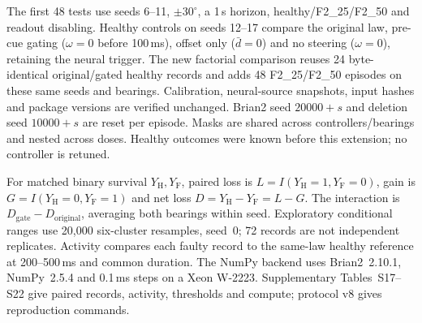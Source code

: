 The first 48 tests use seeds 6--11, $\pm30^\circ$, a 1\,s horizon, healthy/F2\_25/F2\_50 and readout disabling. Healthy controls on seeds 12--17 compare the original law, pre-cue gating ($\omega=0$ before 100\,ms), offset only ($\bar d=0$) and no steering ($\omega=0$), retaining the neural trigger. The new factorial comparison reuses 24 byte-identical original/gated healthy records and adds 48 F2\_25/F2\_50 episodes on these same seeds and bearings. Calibration, neural-source snapshots, input hashes and package versions are verified unchanged. Brian2 seed $20000+s$ and deletion seed $10000+s$ are reset per episode. Masks are shared across controllers/bearings and nested across doses. Healthy outcomes were known before this extension; no controller is retuned.

For matched binary survival $Y_{\mathrm H},Y_{\mathrm F}$, paired loss is $L=I(Y_{\mathrm H}=1,Y_{\mathrm F}=0)$, gain is $G=I(Y_{\mathrm H}=0,Y_{\mathrm F}=1)$ and net loss $D=Y_{\mathrm H}-Y_{\mathrm F}=L-G$. The interaction is $D_{\mathrm{gate}}-D_{\mathrm{original}}$, averaging both bearings within seed. Exploratory conditional ranges use 20{,}000 six-cluster resamples, seed~0; 72 records are not independent replicates. Activity compares each faulty record to the same-law healthy reference at 200--500\,ms and common duration. The NumPy backend uses Brian2~2.10.1, NumPy~2.5.4 and 0.1\,ms steps on a Xeon W-2223. Supplementary Tables~S17--S22 give paired records, activity, thresholds and compute; protocol v8 gives reproduction commands.
